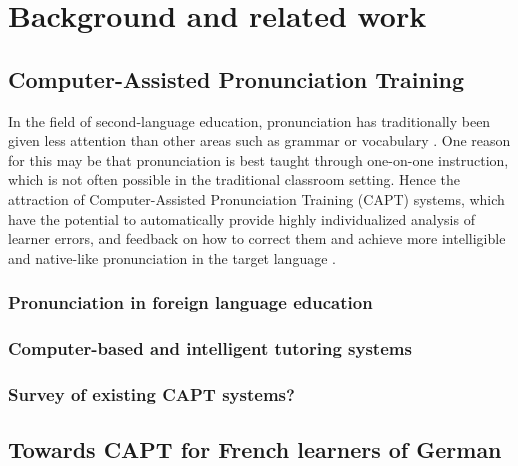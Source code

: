 %
%
\chapter{Background and related work}
\label{chap:background}





\section{Computer-Assisted Pronunciation Training} %

In the field of second-language education, pronunciation has traditionally been given less attention than other areas such as grammar or vocabulary \parencite{Derwing2005}. One reason for this may be that pronunciation is best taught through one-on-one instruction, which is not often possible in the traditional classroom setting. Hence the attraction of Computer-Assisted Pronunciation Training (CAPT) systems, which have the potential to automatically provide highly individualized analysis of learner errors, and feedback on how to correct them and achieve more intelligible and native-like pronunciation in the target language \parencite{witt2012}. 

	\subsection{Pronunciation in foreign language education}


	\subsection{Computer-based and intelligent tutoring systems} 
	
	\subsection{Survey of existing CAPT systems?}
	
	

\section{Towards CAPT for French learners of German}
\label{sec:CAPT4FG}
	
